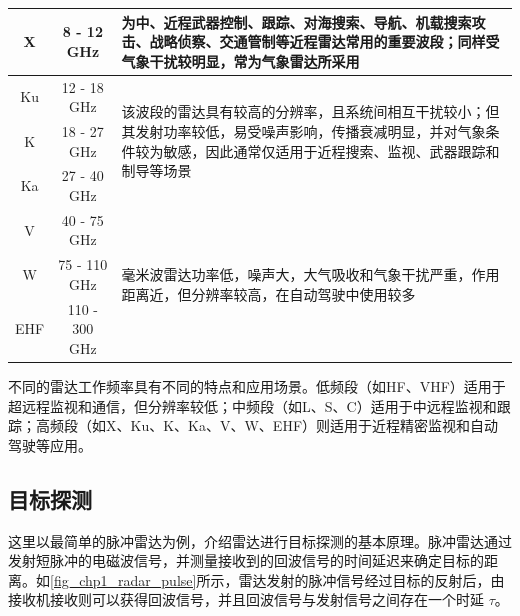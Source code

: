 \begin{table}[htb!]
\begin{tabular}{c|c|p{7cm}}
        \hline
        X    & 8 - 12 GHz     & 为中、近程武器控制、跟踪、对海搜索、导航、机载搜索攻击、战略侦察、交通管制等近程雷达常用的重要波段；同样受气象干扰较明显，常为气象雷达所采用                                          \\
        \hline
        Ku   & 12 - 18 GHz    & \multirow{3}{7cm}{该波段的雷达具有较高的分辨率，且系统间相互干扰较小；但其发射功率较低，易受噪声影响，传播衰减明显，并对气象条件较为敏感，因此通常仅适用于近程搜索、监视、武器跟踪和制导等场景}       \\
        \cline{1-2}
        K    & 18 - 27 GHz    &                                                                                                                 \\
        \cline{1-2}
        Ka   & 27 - 40 GHz    &                                                                                                                 \\
        \hline
        V    & 40 - 75 GHz    & \multirow{3}{7cm}{毫米波雷达功率低，噪声大，大气吸收和气象干扰严重，作用距离近，但分辨率较高，在自动驾驶中使用较多}                                             \\
        \cline{1-2}
        W    & 75 - 110 GHz   &                                                                                                                 \\
        \cline{1-2}
        EHF  & 110 - 300 GHz  &                                                                                                                 \\
        \hline
    \end{tabular}
\end{table}

不同的雷达工作频率具有不同的特点和应用场景。低频段（如HF、VHF）适用于超远程监视和通信，但分辨率较低；中频段（如L、S、C）适用于中远程监视和跟踪；高频段（如X、Ku、K、Ka、V、W、EHF）则适用于近程精密监视和自动驾驶等应用。

\subsection{目标探测}
这里以最简单的脉冲雷达为例，介绍雷达进行目标探测的基本原理。脉冲雷达通过发射短脉冲的电磁波信号，并测量接收到的回波信号的时间延迟来确定目标的距离。如\cref{fig_chp1_radar_pulse}所示，雷达发射的脉冲信号经过目标的反射后，由接收机接收则可以获得回波信号，并且回波信号与发射信号之间存在一个时延 $\tau$。

